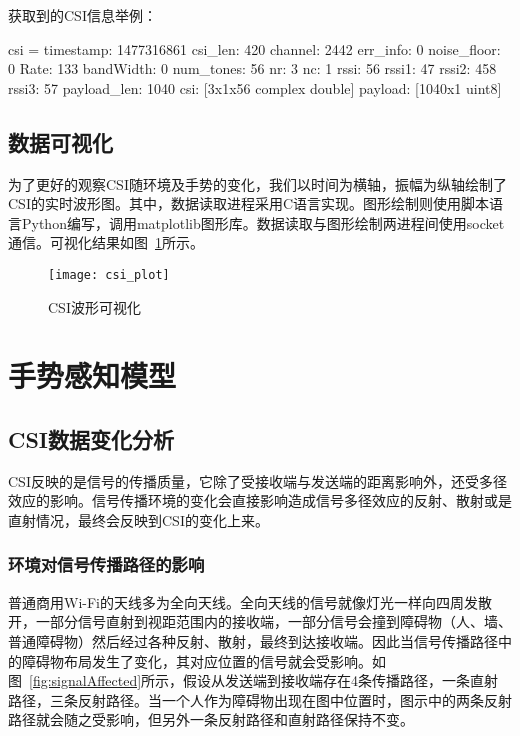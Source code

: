 获取到的CSI信息举例：
\begin{code}[numbers=none]
 csi = 
 timestamp: 1477316861
 csi_len: 420
 channel: 2442
 err_info: 0
 noise_floor: 0
 Rate: 133
 bandWidth: 0
 num_tones: 56
 nr: 3
 nc: 1
 rssi: 56
 rssi1: 47
 rssi2: 458
 rssi3: 57
 payload_len: 1040
 csi: [3x1x56 complex double]
 payload: [1040x1 uint8]
 \end{code}

\subsection{数据可视化}

为了更好的观察CSI随环境及手势的变化，我们以时间为横轴，振幅为纵轴绘制了CSI的实时波形图。其中，数据读取进程采用C语言实现。图形绘制则使用脚本语言Python编写，调用matplotlib图形库。数据读取与图形绘制两进程间使用socket通信。可视化结果如图~\ref{fig:csi_plot}所示。

\begin{figure}[htbp] %
  \centering
  \texttt{[image: csi\_plot]}
  \caption{CSI波形可视化}
  \label{fig:csi_plot}
\end{figure}

\section{手势感知模型}

\subsection{CSI数据变化分析}
CSI反映的是信号的传播质量，它除了受接收端与发送端的距离影响外，还受多径效应的影响。信号传播环境的变化会直接影响造成信号多径效应的反射、散射或是直射情况，最终会反映到CSI的变化上来。
\subsubsection{环境对信号传播路径的影响}
普通商用Wi-Fi的天线多为全向天线。全向天线的信号就像灯光一样向四周发散开，一部分信号直射到视距范围内的接收端，一部分信号会撞到障碍物（人、墙、普通障碍物）然后经过各种反射、散射，最终到达接收端。因此当信号传播路径中的障碍物布局发生了变化，其对应位置的信号就会受影响。如图~\ref{fig:signalAffected}所示，假设从发送端到接收端存在4条传播路径，一条直射路径，三条反射路径。当一个人作为障碍物出现在图中位置时，图示中的两条反射路径就会随之受影响，但另外一条反射路径和直射路径保持不变。


